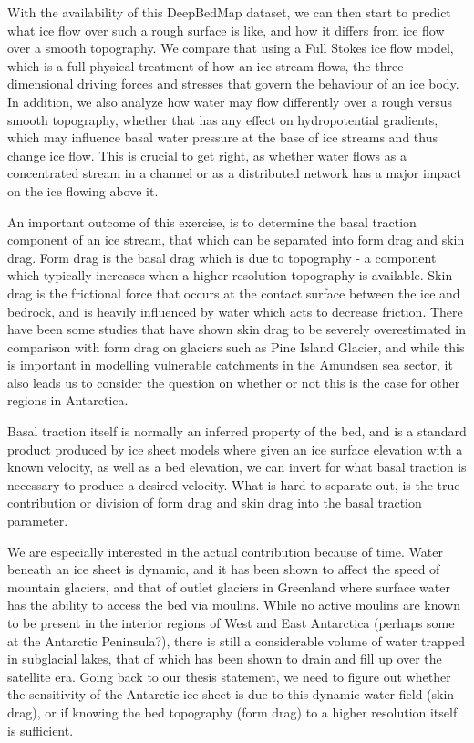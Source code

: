 With the availability of this DeepBedMap dataset, we can then start to predict what ice flow over such a rough surface is like, and how it differs from ice flow over a smooth topography.
We compare that using a Full Stokes ice flow model, which is a full physical treatment of how an ice stream flows, the three-dimensional driving forces and stresses that govern the behaviour of an ice body.
In addition, we also analyze how water may flow differently over a rough versus smooth topography, whether that has any effect on hydropotential gradients, which may influence basal water pressure at the base of ice streams and thus change ice flow.
This is crucial to get right, as whether water flows as a concentrated stream in a channel or as a distributed network has a major impact on the ice flowing above it.

An important outcome of this exercise, is to determine the basal traction component of an ice stream, that which can be separated into form drag and skin drag.
Form drag is the basal drag which is due to topography - a component which typically increases when a higher resolution topography is available.
Skin drag is the frictional force that occurs at the contact surface between the ice and bedrock, and is heavily influenced by water which acts to decrease friction.
There have been some studies that have shown skin drag to be severely overestimated in comparison with form drag on glaciers such as Pine Island Glacier, and while this is important in modelling vulnerable catchments in the Amundsen sea sector, it also leads us to consider the question on whether or not this is the case for other regions in Antarctica.

Basal traction itself is normally an inferred property of the bed, and is a standard product produced by ice sheet models where given an ice surface elevation with a known velocity, as well as a bed elevation, we can invert for what basal traction is necessary to produce a desired velocity.
What is hard to separate out, is the true contribution or division of form drag and skin drag into the basal traction parameter.

We are especially interested in the actual contribution because of time.
Water beneath an ice sheet is dynamic, and it has been shown to affect the speed of mountain glaciers, and that of outlet glaciers in Greenland where surface water has the ability to access the bed via moulins.
While no active moulins are known to be present in the interior regions of West and East Antarctica (perhaps some at the Antarctic Peninsula?), there is still a considerable volume of water trapped in subglacial lakes, that of which has been shown to drain and fill up over the satellite era.
Going back to our thesis statement, we need to figure out whether the sensitivity of the Antarctic ice sheet is due to this dynamic water field (skin drag), or if knowing the bed topography (form drag) to a higher resolution itself is sufficient.

